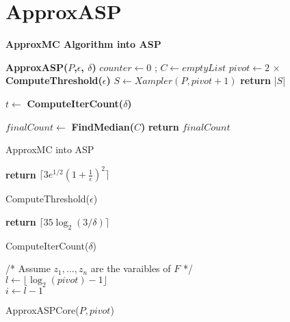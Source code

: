 \section{ApproxASP}

\textbf{ApproxMC Algorithm into ASP}

\begin{algorithm}[h]
\textbf{ApproxASP($P$,$\epsilon$, $\delta$)} \;
\SetAlgoLined
{}
 $counter \gets 0$ ; $C \gets emptyList$\;
 $pivot \gets  2 \, \times $ \textbf{ComputeThreshold($\epsilon$)} \;
 $S \gets Xampler(P, pivot + 1)$   
 { %
 \textbf{return} |$S$|  
 } %
 { %
 $t \gets $ \textbf{ComputeIterCount($\delta$)} 
 
 } %
 $finalCount \gets $ \textbf{FindMedian($C$)} \;
 \textbf{return} $finalCount$
 
 \caption{ApproxMC into ASP}
\end{algorithm}


\begin{algorithm}
\textbf{return} $\lceil 3 e^{1/2} (1 + \frac{1}{\epsilon})^2 \rceil$
\caption{ComputeThreshold($\epsilon$)}
\end{algorithm}

\begin{algorithm}
\textbf{return} $\lceil 35 \log_2 (3/\delta) \rceil$
\caption{ComputeIterCount($\delta$)}
\end{algorithm}

\begin{algorithm}
/* Assume $z_1 , ..., z_n $ are the varaibles of $F$ */ \\
$ l \gets \lfloor \log_2 (pivot) - 1 \rfloor$ \\
$ i \gets l - 1$ \\


\caption{ApproxASPCore($P, pivot$)}
\end{algorithm}
